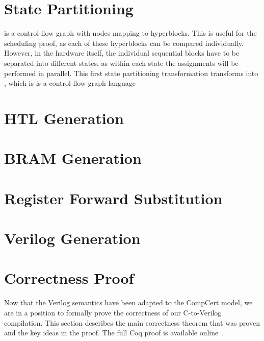 \section{State Partitioning}%
\label{sec:hg:state-partitioning}

\rtlpar{} is a control-flow graph with nodes mapping to hyperblocks.  This is
useful for the scheduling proof, as each of these hyperblocks can be compared
individually.  However, in the hardware itself, the individual sequential blocks
have to be separated into different states, as within each state the
assignments will be performed in parallel.  This first state partitioning
transformation transforms \rtlpar{} into \rtlsubpar{}, which is is a
control-flow graph language

\section{HTL Generation}%
\label{sec:hg:htl-generation}

\section{BRAM Generation}%
\label{sec:hg:bram-generation}

\section{Register Forward Substitution}%
\label{sec:hg:register-forward-substitution}

\section{Verilog Generation}%
\label{sec:hg:verilog-generation}

\section{Correctness Proof}\label{sec:proof}


Now that the Verilog semantics have been adapted to the CompCert model, we are
in a position to formally prove the correctness of our C-to-Verilog compilation.
This section describes the main correctness theorem that was proven and the key
ideas in the proof. The full Coq proof is available
online~\cite{yann_herklotz_2021_5093839}.

